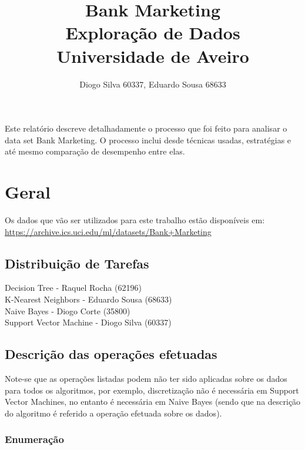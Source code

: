 \documentclass[portugues,final]{revdetua}
\begin{document}

\title{\textbf{Bank Marketing}\\ Exploração de Dados \\Universidade de Aveiro}
\author{Diogo Silva 60337, Eduardo Sousa 68633}
\maketitle
\begin{resumo} %
Este relatório descreve detalhadamente o processo que foi feito para analisar o data set Bank Marketing.
O processo inclui desde técnicas usadas, estratégias e até mesmo comparação de desempenho entre elas.
\end{resumo}

\section{Geral}

Os dados que vão ser utilizados para este trabalho estão disponíveis em:
\url{https://archive.ics.uci.edu/ml/datasets/Bank+Marketing}

\subsection{Distribuição de Tarefas}

Decision Tree - Raquel Rocha (62196)\\
K-Nearest Neighbors - Eduardo Sousa (68633)\\
Naive Bayes - Diogo Corte (35800)\\
Support Vector Machine - Diogo Silva (60337)

\subsection{Descrição das operações efetuadas}

Note-se que as operações listadas podem não ter sido aplicadas sobre os dados para todos os algoritmos, por exemplo, discretização não é necessária em Support Vector Machines, no entanto é necessária em Naive Bayes (sendo que na descrição do algoritmo é referido a operação efetuada sobre os dados).

\subsubsection{Enumeração}
\end{document}
